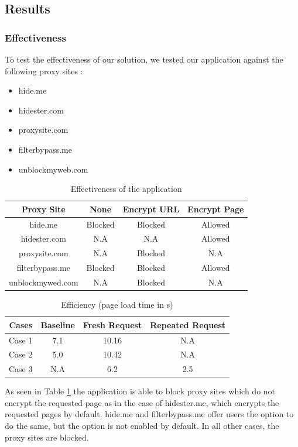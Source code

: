 \documentclass[a4paper,11pt,twocolumn]{article}
\begin{document}
\subsection{Results} \label{result}
\subsubsection{Effectiveness}
To test the effectiveness of our solution, we tested our application against the following proxy sites :
\begin{itemize}
\item{hide.me}
\item{hidester.com}
\item{proxysite.com}
\item{filterbypass.me}
\item{unblockmyweb.com}
\end{itemize}

\begin{table}[t]
\centering
\caption{Effectiveness of the application} \label{effect}
	\begin{tabular}{|c|c|c|c|}
	\hline
	Proxy Site&None&Encrypt URL&Encrypt Page \\
	\hline
	hide.me & Blocked & Blocked & Allowed\\
	\hline
	hidester.com & N.A & N.A & Allowed\\
	\hline
	proxysite.com &  N.A & Blocked & N.A\\
	\hline
	filterbypass.me & Blocked & Blocked & Allowed\\
	\hline
	unblockmywed.com &N.A & Blocked  & N.A\\
	\hline
	\end{tabular}
\end{table}
\begin{table}[t] 
\centering
\caption{Efficiency (page load time in s)} \label{efficiency}
	\begin{tabular}{|c|c|c|c|}
	\hline
	Cases&Baseline&Fresh Request&Repeated Request \\
	\hline
	Case 1& 7.1 & 10.16 & N.A\\
	\hline
	Case 2 & 5.0 & 10.42 & N.A\\
	\hline
	Case 3 &  N.A & 6.2 & 2.5\\
	\hline
	\end{tabular}
\end{table}
As seen in Table \ref{effect} the application is able to block proxy sites which do not encrypt the requested page as in the case of hidester.me, which encrypts the requested pages by default. hide.me and filterbypass.me offer users the option to do the same, but the option is not enabled by default. In all other cases, the proxy sites are blocked. 
\end{document}
